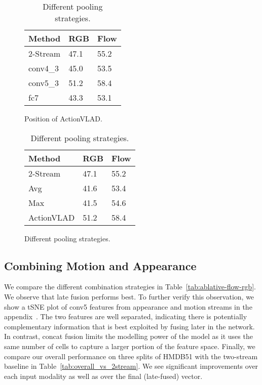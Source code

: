 \documentclass[10pt,twocolumn,letterpaper]{article}
\newcommand{\methodTag}[0]{ActionVLAD}
\newcommand{\tableSize}[0]{\scriptsize}
\begin{document}
\begin{table}
    \caption{Evaluation of (a) \methodTag{} at different positions in a VGG-16 network;
    and (b) \methodTag{} compared to other pooling strategies, on HMDB51 split 1.}
    \begin{subfigure}{0.49\linewidth}
        \centering
        \caption{Position of \methodTag{}.}       
        \label{tab:ablative-fc-conv}
        \tableSize{}
        \centering
        \begin{tabular}{lll}
        \toprule
        Method               & RGB      & Flow \\ \midrule
        2-Stream           & 47.1   & 55.2 \\
        conv4\_3        & 45.0 &  53.5   \\
        conv5\_3       & 51.2 & 58.4 \\
        fc7         & 43.3 & 53.1 \\ \bottomrule
        \end{tabular}
    \end{subfigure}\hfill
    \begin{subfigure}{0.49\linewidth}
        \caption{Different pooling strategies.}\label{tab:ablative-max-avg-netvlad}
        \tableSize{}
        \centering
        \begin{tabular}{lll}
        \toprule
        Method               & RGB      & Flow \\ \midrule
        2-Stream           & 47.1   & 55.2 \\
        Avg        & 41.6 &  53.4   \\
        Max         & 41.5 & 54.6 \\
        \methodTag{} & 51.2 & 58.4 \\ \bottomrule
        \end{tabular}
    \end{subfigure}
\end{table}

\subsection{Combining Motion and Appearance}\label{sec:expts:flowRGB}


We compare the different combination strategies in Table~\ref{tab:ablative-flow-rgb}.
We observe that late fusion performs best.
To further verify this observation, we show a tSNE plot of 
conv5 features from appearance and motion streams in the appendix~\cite{appendix}.
The two features are well separated, indicating there is potentially
complementary information that is best exploited by fusing
later in the network.
In contrast, concat fusion limits the modelling power of the model as it uses the same number of cells to capture a larger portion of the feature space. Finally, we compare our overall performance
on three splits of HMDB51 with the two-stream baseline in Table~\ref{tab:overall_vs_2stream}.
We see significant improvements over each input modality as well as over the
final (late-fused) vector.
\end{document}
